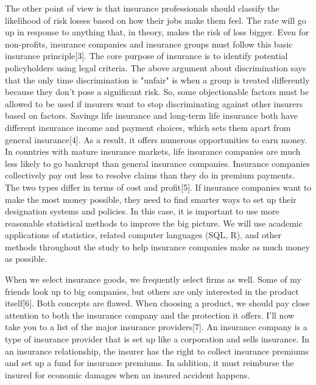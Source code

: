 \documentclass[journal]{IEEEtran}
\begin{document}
\par The other point of view is that insurance professionals should classify the likelihood of risk losses based on how their jobs make them feel. The rate will go up in response to anything that, in theory, makes the risk of loss bigger. Even for non-profits, insurance companies and insurance groups must follow this basic insurance principle[3]. The core purpose of insurance is to identify potential policyholders using legal criteria. The above argument about discrimination says that the only time discrimination is "unfair" is when a group is treated differently because they don't pose a significant risk. So, some objectionable factors must be allowed to be used if insurers want to stop discriminating against other insurers based on factors. Savings life insurance and long-term life insurance both have different insurance income and payment choices, which sets them apart from general insurance[4]. As a result, it offers numerous opportunities to earn money. In countries with mature insurance markets, life insurance companies are much less likely to go bankrupt than general insurance companies. Insurance companies collectively pay out less to resolve claims than they do in premium payments. The two types differ in terms of cost and profit[5]. If insurance companies want to make the most money possible, they need to find smarter ways to set up their designation systems and policies. In this case, it is important to use more reasonable statistical methods to improve the big picture. We will use academic applications of statistics, related computer languages (SQL, R), and other methods throughout the study to help insurance companies make as much money as possible.
\par When we select insurance goods, we frequently select firms as well.
Some of my friends look up to big companies, but others are only interested in the product itself[6]. Both concepts are flawed. When choosing a product, we should pay close attention to both the insurance company and the protection it offers. I'll now take you to a list of the major insurance providers[7]. An insurance company is a type of insurance provider that is set up like a corporation and sells insurance. In an insurance relationship, the insurer has the right to collect insurance premiums and set up a fund for insurance premiums. In addition, it must reimburse the insured for economic damages when an insured accident happens.
\end{document}
